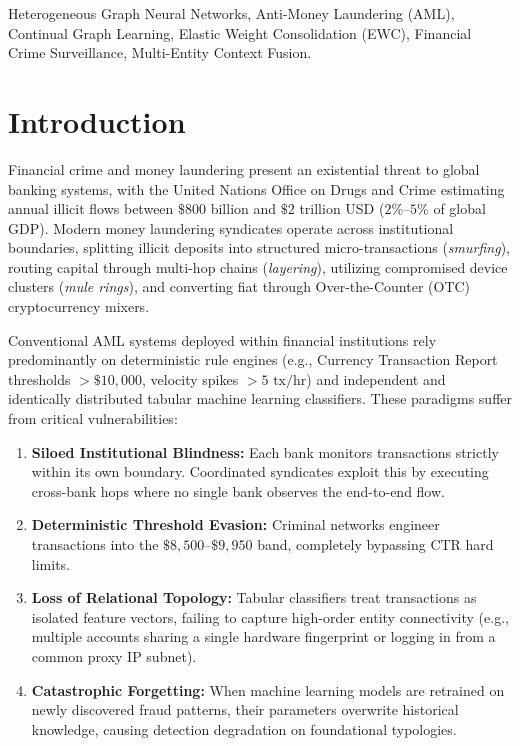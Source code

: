 \documentclass[conference]{IEEEtran}
\begin{document}
\begin{IEEEkeywords}
Heterogeneous Graph Neural Networks, Anti-Money Laundering (AML), Continual Graph Learning, Elastic Weight Consolidation (EWC), Financial Crime Surveillance, Multi-Entity Context Fusion.
\end{IEEEkeywords}

\section{Introduction}
Financial crime and money laundering present an existential threat to global banking systems, with the United Nations Office on Drugs and Crime estimating annual illicit flows between $\$800$ billion and $\$2$ trillion USD ($2\%\text{--}5\%$ of global GDP). Modern money laundering syndicates operate across institutional boundaries, splitting illicit deposits into structured micro-transactions (\textit{smurfing}), routing capital through multi-hop chains (\textit{layering}), utilizing compromised device clusters (\textit{mule rings}), and converting fiat through Over-the-Counter (OTC) cryptocurrency mixers.

Conventional AML systems deployed within financial institutions rely predominantly on deterministic rule engines (e.g., Currency Transaction Report thresholds $> \$10,000$, velocity spikes $> 5\text{ tx/hr}$) and independent and identically distributed tabular machine learning classifiers. These paradigms suffer from critical vulnerabilities:
\begin{enumerate}
    \item \textbf{Siloed Institutional Blindness:} Each bank monitors transactions strictly within its own boundary. Coordinated syndicates exploit this by executing cross-bank hops where no single bank observes the end-to-end flow.
    \item \textbf{Deterministic Threshold Evasion:} Criminal networks engineer transactions into the $\$8,500\text{--}\$9,950$ band, completely bypassing CTR hard limits.
    \item \textbf{Loss of Relational Topology:} Tabular classifiers treat transactions as isolated feature vectors, failing to capture high-order entity connectivity (e.g., multiple accounts sharing a single hardware fingerprint or logging in from a common proxy IP subnet).
    \item \textbf{Catastrophic Forgetting:} When machine learning models are retrained on newly discovered fraud patterns, their parameters overwrite historical knowledge, causing detection degradation on foundational typologies.
\end{enumerate}
\end{document}
